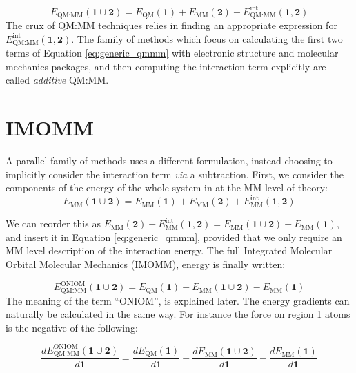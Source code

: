 \begin{equation}
    E_{\text{QM}:\text{MM}}(\bm{1} \cup \bm{2}) = E_{\text{QM}}(\bm{1}) + E_{\text{MM}}(\bm{2}) + E^{\text{int}}_{\text{QM}:\text{MM}}(\bm{1},\bm{2})
    \label{eq:generic_qmmm}
\end{equation}
 The crux of QM:MM techniques relies in finding an appropriate expression for $E^{\text{int}}_{\text{QM}:\text{MM}}(\bm{1},\bm{2})$. The family of methods which focus on calculating the first two terms of Equation \ref{eq:generic_qmmm} with electronic structure and molecular mechanics packages, and then computing the interaction term explicitly are called \textit{additive} QM:MM.

\section{IMOMM}
A parallel family of methods uses a different formulation, instead choosing to implicitly consider the interaction term \textit{via} a subtraction. First, we consider the components of the energy of the whole system in at the MM level of theory:
\begin{equation}
    E_{\text{MM}}(\bm{1} \cup \bm{2}) = E_{\text{MM}}(\bm{1}) +  E_{\text{MM}}(\bm{2}) + E^{\text{int}}_{\text{MM}}(\bm{1},\bm{2})
\end{equation}{}

We can reorder this as $E_{\text{MM}}(\bm{2}) + E^{\text{int}}_{\text{MM}}(\bm{1},\bm{2}) = E_{\text{MM}}(\bm{1} \cup \bm{2}) - E_{\text{MM}}(\bm{1})$, and insert it in Equation \ref{eq:generic_qmmm}, provided that we only require an MM level description of the interaction energy. The full Integrated Molecular Orbital Molecular Mechanics (IMOMM), energy is finally written:\cite{Maseras1995}

\begin{equation}
    E^{\text{ONIOM}}_{\text{QM}:\text{MM}}(\bm{1} \cup \bm{2}) = E_{\text{QM}}(\bm{1}) + E_{\text{MM}}(\bm{1} \cup \bm{2}) - E_{\text{MM}}(\bm{1})
    \label{eq:imomm}
\end{equation}
The meaning of the term ``ONIOM'', is explained later. The energy gradients can naturally be calculated in the same way. For instance the force on region 1 atoms is the negative of the following:

\begin{equation}
    \frac{dE^{\text{ONIOM}}_{\text{QM}:\text{MM}}(\bm{1} \cup \bm{2})}{d\bm{1}} = \frac{dE_{\text{QM}}(\bm{1})}{{d\bm{1}}} + \frac{dE_{\text{MM}}(\bm{1} \cup \bm{2})}{d\bm{1}} - \frac{dE_{\text{MM}}(\bm{1})}{d\bm{1}}
    \label{eq:imomm_grad}
\end{equation}

